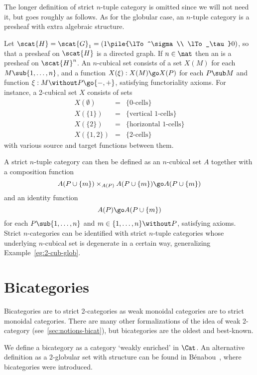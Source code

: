 The longer definition of strict $n$-tuple category is omitted since we will
not need it, but goes roughly as follows.  As for the globular case, an
$n$-tuple category is a presheaf with extra algebraic structure.  

Let $\scat{H} = \scat{G}_1 = (1 \pile{\lTo^\sigma\\ \lTo_\tau} 0)$, so that
a presheaf on $\scat{H}$ is a directed graph.%
%
%
 If $n\in\nat$ then an
 is a presheaf on $\scat{H}^n$.  An $n$-cubical set
consists of a set $X(M)$ for each $M \sub \{1, \ldots, n\}$, and a function
$X(\xi): X(M) \go X(P)$ for each $P \sub M$ and function $\xi: M\without P
\go \{-, +\}$, satisfying functoriality axioms.  For instance, a 2-cubical
set $X$ consists of sets
%
\begin{eqnarray*}
X(\emptyset)	&=	&\{ 0 \textrm{-cells} \}	\\
X(\{1\})	&=	&\{ \textrm{vertical } 1 \textrm{-cells} \}	\\
X(\{2\})	&=	&\{ \textrm{horizontal } 1 \textrm{-cells} \}	\\
X(\{1, 2\})	&=	&\{ 2 \textrm{-cells} \}
\end{eqnarray*}
%
with various source and target functions between them. 

A strict $n$-tuple category can then be defined as an $n$-cubical set $A$
together with a composition function
\[
A(P \cup \{ m \}) \times_{A(P)} A(P \cup \{ m \})
\go
A(P \cup \{ m \}) 
\]
and an identity function
\[
A(P)
\go
A(P \cup \{ m \}) 
\]
for each $P \sub \{1, \ldots, n\}$ and $m \in \{1, \ldots, n\} \without P$,
satisfying axioms.  Strict $n$-categories can be identified with strict
$n$-tuple categories whose underlying $n$-cubical set is degenerate%
%
%
in a
certain way, generalizing Example~\ref{eg:2-cub-glob}.



\section{Bicategories}

Bicategories are to strict 2-categories as weak monoidal categories are to
strict monoidal categories.  There are many other formalizations of the
idea of weak 2-category (see~\ref{sec:notions-bicat}), but bicategories are
the oldest and best-known.

We define a bicategory as a category `weakly enriched' in $\Cat$.  An
alternative definition as a 2-globular set with structure can be found in
B\'enabou~\cite{Ben},%
%
%
where bicategories were introduced.

